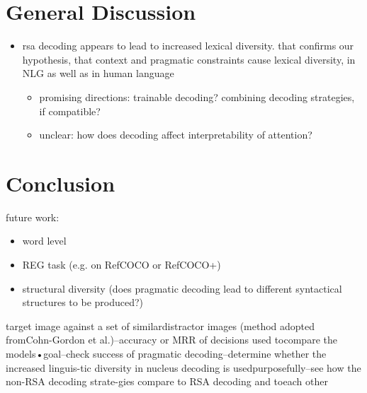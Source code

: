\documentclass[11pt,a4paper]{article}
\begin{document}
\section{General Discussion}

\begin{itemize}

\item rsa decoding appears to lead to increased lexical diversity. that confirms our hypothesis, that context and pragmatic constraints cause lexical diversity, in NLG as well as in human language

    \begin{itemize}
        \item promising directions: trainable decoding? combining decoding strategies, if compatible?
        \item unclear: how does decoding affect interpretability of attention?
    \end{itemize}

\end{itemize}

\section{Conclusion}

future work: 
\begin{itemize}
    \item word level
    \item REG task (e.g. on RefCOCO or RefCOCO+)
    \item structural diversity (does pragmatic decoding lead to different syntactical structures to be produced?)
\end{itemize}


target image against a set of similardistractor images (method adopted fromCohn-Gordon et al.)–accuracy or MRR of decisions used tocompare the models•goal–check success of pragmatic decoding–determine whether the increased linguis-tic diversity in nucleus decoding is usedpurposefully–see how the non-RSA decoding strate-gies compare to RSA decoding and toeach other




\end{document}
